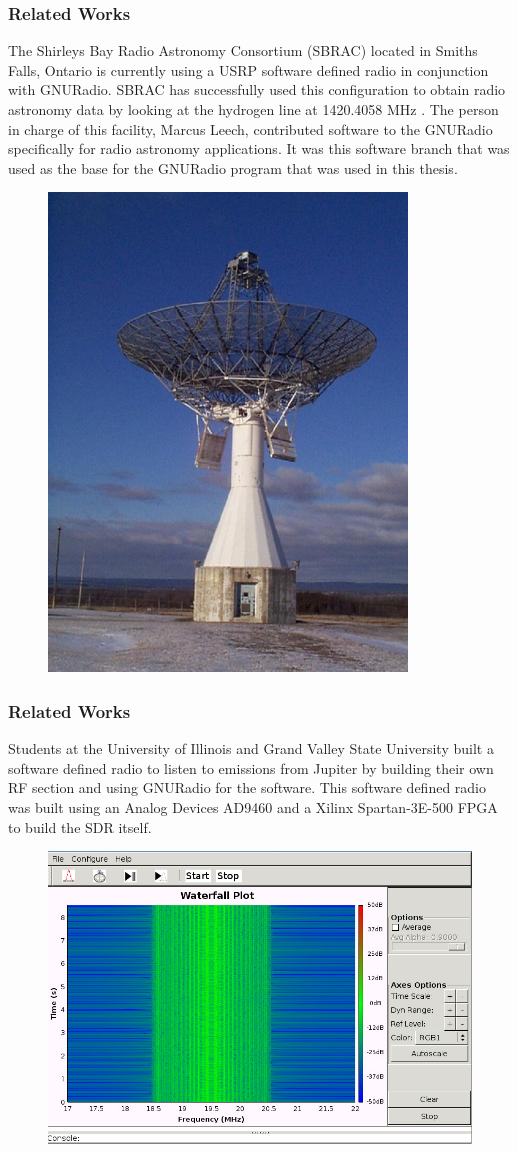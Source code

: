 \documentclass[notes]{beamer}
\begin{document}
\begin{frame}
\frametitle{Related Works}

The Shirleys Bay Radio Astronomy Consortium (SBRAC) located in Smiths Falls, Ontario is currently using a USRP software defined radio in conjunction with GNURadio.  SBRAC has successfully used this configuration to obtain radio astronomy data by looking at the hydrogen line at 1420.4058 MHz \cite{Leech2007}.  The person in charge of this facility, Marcus Leech, contributed software to the GNURadio specifically for radio astronomy applications.  It was this software branch that was used as the base for the GNURadio program that was used in this thesis.

\begin{figure}\label{sbrac}
\includegraphics[width=0.2\linewidth]{images/ra.jpg}
\end{figure}
\end{frame}
\begin{frame}
\frametitle{Related Works}

Students at the University of Illinois and Grand Valley State University built a software defined radio to listen to emissions from Jupiter\cite{Behnke} by building their own RF section and using GNURadio for the software.  This software defined radio was built using an Analog Devices AD9460 and a Xilinx Spartan-3E-500 FPGA to build the SDR itself.

\begin{figure}\label{behnke}
\includegraphics[width=0.5\linewidth]{images/behnke_GUI.png}
\end{figure}
\end{frame}
\end{document}
